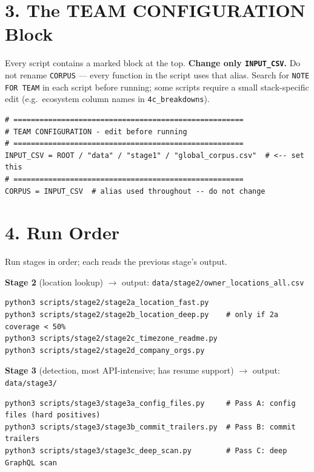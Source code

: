 \documentclass[10pt,a4paper]{article}
\begin{document}
\section*{3. The TEAM CONFIGURATION Block}

Every script contains a marked block at the top. \textbf{Change only \texttt{INPUT\_CSV}.}
Do not rename \texttt{CORPUS} --- every function in the script uses that alias.
Search for \texttt{NOTE FOR TEAM} in each script before running; some scripts require
a small stack-specific edit (e.g.\ ecosystem column names in \texttt{4c\_breakdowns}).

\begin{lstlisting}
# =====================================================
# TEAM CONFIGURATION - edit before running
# =====================================================
INPUT_CSV = ROOT / "data" / "stage1" / "global_corpus.csv"  # <-- set this
# =====================================================
CORPUS = INPUT_CSV  # alias used throughout -- do not change
\end{lstlisting}

\section*{4. Run Order}

Run stages in order; each reads the previous stage's output.

\vspace{2pt}
\noindent\textbf{Stage 2} (location lookup) $\to$ output: \texttt{data/stage2/owner\_locations\_all.csv}
\begin{lstlisting}
python3 scripts/stage2/stage2a_location_fast.py
python3 scripts/stage2/stage2b_location_deep.py    # only if 2a coverage < 50%
python3 scripts/stage2/stage2c_timezone_readme.py
python3 scripts/stage2/stage2d_company_orgs.py
\end{lstlisting}

\noindent\textbf{Stage 3} (detection, most API-intensive; has resume support) $\to$ output: \texttt{data/stage3/}
\begin{lstlisting}
python3 scripts/stage3/stage3a_config_files.py     # Pass A: config files (hard positives)
python3 scripts/stage3/stage3b_commit_trailers.py  # Pass B: commit trailers
python3 scripts/stage3/stage3c_deep_scan.py        # Pass C: deep GraphQL scan
\end{lstlisting}
\end{document}

